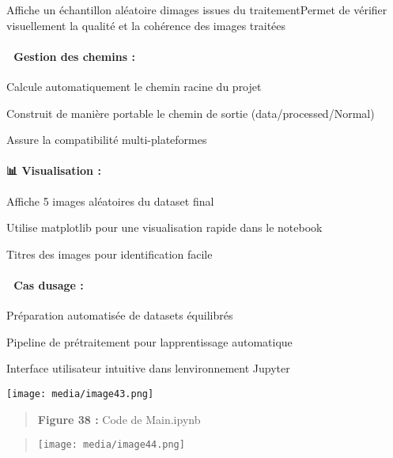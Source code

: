 Affiche un échantillon aléatoire d\textquotesingle images issues du
traitementPermet de vérifier visuellement la qualité et la cohérence des
images traitées

\paragraph[📁 \textbf{Gestion des chemins
:}]{\texorpdfstring{\protect\hypertarget{anchor-72}{}{}📁
\textbf{Gestion des chemins
:}}{📁 Gestion des chemins :}}\label{gestion-des-chemins}

Calcule automatiquement le chemin racine du projet

Construit de manière portable le chemin de sortie
(data/processed/Normal)

Assure la compatibilité multi-plateformes

\paragraph[📊 \textbf{Visualisation
:}]{\texorpdfstring{\protect\hypertarget{anchor-73}{}{}📊
\textbf{Visualisation :}}{📊 Visualisation :}}\label{visualisation}

Affiche 5 images aléatoires du dataset final

Utilise matplotlib pour une visualisation rapide dans le notebook

Titres des images pour identification facile

\paragraph[🎯 \textbf{Cas d\textquotesingle usage
:}]{\texorpdfstring{\protect\hypertarget{anchor-74}{}{}🎯 \textbf{Cas
d\textquotesingle usage
:}}{🎯 Cas d\textquotesingle usage :}}\label{cas-dusage-1}

Préparation automatisée de datasets équilibrés

Pipeline de prétraitement pour l\textquotesingle apprentissage
automatique

Interface utilisateur intuitive dans l\textquotesingle environnement
Jupyter

\texttt{[image: media/image43.png]}

\begin{quote}
\textbf{Figure 38 : }Code de Main.ipynb
\end{quote}

\begin{quote}
\texttt{[image: media/image44.png]}
\end{quote}

